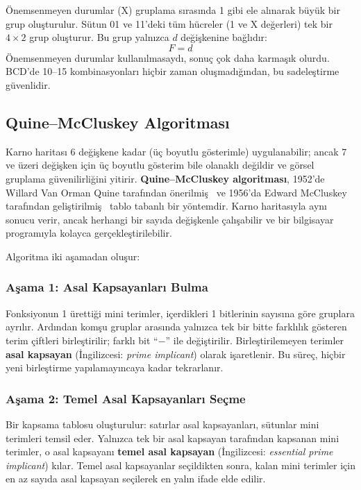 \begin{ornek}[B.7]
Önemsenmeyen durumlar (X) gruplama sırasında 1 gibi ele alınarak büyük bir grup oluşturulur. Sütun 01 ve 11'deki tüm hücreler (1 ve X değerleri) tek bir $4 \times 2$ grup oluşturur. Bu grup yalnızca $d$ değişkenine bağlıdır:
\[
F = d
\]
Önemsenmeyen durumlar kullanılmasaydı, sonuç çok daha karmaşık olurdu. BCD'de 10--15 kombinasyonları hiçbir zaman oluşmadığından, bu sadeleştirme güvenlidir.
\end{ornek}



\subsection{Quine--McCluskey Algoritması}

Karno haritası 6 değişkene kadar (üç boyutlu gösterimle) uygulanabilir; ancak 7 ve üzeri değişken için üç boyutlu gösterim bile olanaklı değildir ve görsel gruplama güvenilirliğini yitirir. \textbf{Quine--McCluskey algoritması}, 1952'de Willard Van Orman Quine tarafından önerilmiş~\cite{quine1952} ve 1956'da Edward McCluskey tarafından geliştirilmiş~\cite{mccluskey1956} tablo tabanlı bir yöntemdir. Karno haritasıyla aynı sonucu verir, ancak herhangi bir sayıda değişkenle çalışabilir ve bir bilgisayar programıyla kolayca gerçekleştirilebilir.

Algoritma iki aşamadan oluşur:

\subsubsection{Aşama 1: Asal Kapsayanları Bulma}
Fonksiyonun 1 ürettiği mini terimler, içerdikleri 1 bitlerinin sayısına göre gruplara ayrılır. Ardından komşu gruplar arasında yalnızca tek bir bitte farklılık gösteren terim çiftleri birleştirilir; farklı bit ``$-$'' ile değiştirilir. Birleştirilemeyen terimler \textbf{asal kapsayan} (İngilizcesi: \textit{prime implicant}) olarak işaretlenir. Bu süreç, hiçbir yeni birleştirme yapılamayıncaya kadar tekrarlanır.

\subsubsection{Aşama 2: Temel Asal Kapsayanları Seçme}
Bir kapsama tablosu oluşturulur: satırlar asal kapsayanları, sütunlar mini terimleri temsil eder. Yalnızca tek bir asal kapsayan tarafından kapsanan mini terimler, o asal kapsayanı \textbf{temel asal kapsayan} (İngilizcesi: \textit{essential prime implicant}) kılar. Temel asal kapsayanlar seçildikten sonra, kalan mini terimler için en az sayıda asal kapsayan seçilerek en yalın ifade elde edilir.

